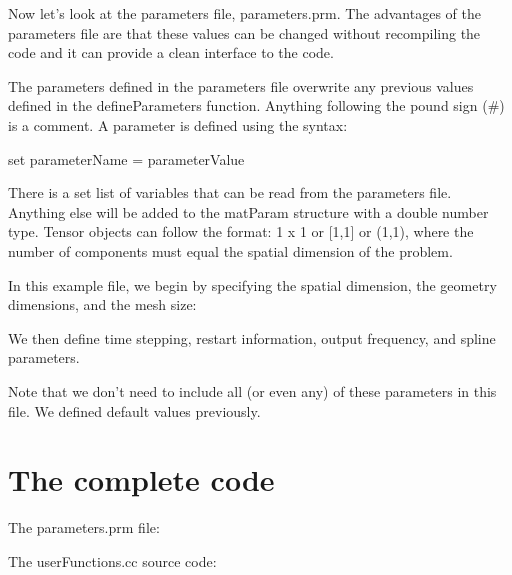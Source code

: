 Now let's look at the parameters file, {\ttfamily parameters.\-prm}. The advantages of the parameters file are that these values can be changed without recompiling the code and it can provide a clean interface to the code. 

The parameters defined in the parameters file overwrite any previous values defined in the {\ttfamily define\-Parameters} function. Anything following the pound sign (\#) is a comment. A parameter is defined using the syntax\-:

{\ttfamily set} {\ttfamily parameter\-Name} {\ttfamily =} {\ttfamily parameter\-Value} 

There is a set list of variables that can be read from the parameters file. Anything else will be added to the {\ttfamily mat\-Param} structure with a double number type. Tensor objects can follow the format\-: 1 x 1 or \mbox{[}1,1\mbox{]} or (1,1), where the number of components must equal the spatial dimension of the problem.

In this example file, we begin by specifying the spatial dimension, the geometry dimensions, and the mesh size\-:


\begin{DoxyCodeInclude}

\end{DoxyCodeInclude}


We then define time stepping, restart information, output frequency, and spline parameters.


\begin{DoxyCodeInclude}

\end{DoxyCodeInclude}


Note that we don't need to include all (or even any) of these parameters in this file. We defined default values previously.

\section*{The complete code }

The {\ttfamily parameters.\-prm} file\-: 
\begin{DoxyCodeInclude}
\end{DoxyCodeInclude}


The {\ttfamily user\-Functions.\-cc} source code\-: 
\begin{DoxyCodeInclude}
\end{DoxyCodeInclude}
 